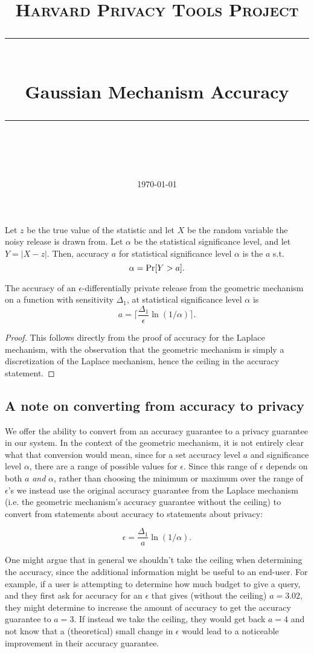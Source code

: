 \documentclass[11pt]{scrartcl} %
\title{
	\normalfont\normalsize
	\textsc{Harvard Privacy Tools Project}\\ %
	\vspace{25pt} %
	\rule{\linewidth}{0.5pt}\\ %
	\vspace{20pt} %
	{\huge Gaussian Mechanism Accuracy}\\ %
	\vspace{12pt} %
	\rule{\linewidth}{2pt}\\ %
	\vspace{12pt} %
}
\date{\normalsize\today} %
\begin{document}
\maketitle

\begin{definition}
Let $z$ be the true value of the statistic and let $X$ be the random variable the noisy release is drawn from. Let $\alpha$ be the statistical significance level, and let $Y = \vert X-z \vert.$ Then, accuracy $a$ for statistical significance level $\alpha$ is the $a$ s.t.
$$ \alpha = \text{Pr}[Y > a].$$
\end{definition}

\begin{theorem}
The accuracy of an $\epsilon$-differentially private release from the geometric mechanism on a function with sensitivity $\Delta_1$, at statistical significance level $\alpha$ is
$$ a = \lceil \frac{\Delta_1}{\epsilon}\ln(1/\alpha) \rceil.$$
\end{theorem}\cite{balcer2017differential, ghosh2012universally}

\begin{proof}
This follows directly from the proof of accuracy for the Laplace mechanism, with the observation that the geometric mechanism is simply a discretization of the Laplace mechanism, hence the ceiling in the accuracy statement.
\end{proof}

\subsection{A note on converting from accuracy to privacy}

We offer the ability to convert from an accuracy guarantee to a privacy guarantee in our system. In the context of the geometric mechanism, it is not entirely clear what that conversion would mean, since for a set accuracy level $a$ and significance level $\alpha$, there are a range of possible values for $\epsilon$. Since this range of $\epsilon$ depends on both $a$ \textit{and} $\alpha$, rather than choosing the minimum or maximum over the range of $\epsilon$'s we instead use the original accuracy guarantee from the Laplace mechanism (i.e. the geometric mechanism's accuracy guarantee without the ceiling) to convert from statements about accuracy to statements about privacy:

$$ \epsilon = \frac{\Delta_1}{a}\ln(1/\alpha).$$

One might argue that in general we shouldn't take the ceiling when determining the accuracy, since the additional information might be useful to an end-user. For example, if a user is attempting to determine how much budget to give a query, and they first ask for accuracy for an $\epsilon$ that gives (without the ceiling) $a = 3.02$, they might determine to increase the amount of accuracy to get the accuracy guarantee to $a = 3$. If instead we take the ceiling, they would get back $a = 4$ and not know that a (theoretical) small change in $\epsilon$ would lead to a noticeable improvement in their accuracy guarantee. 



\end{document}
